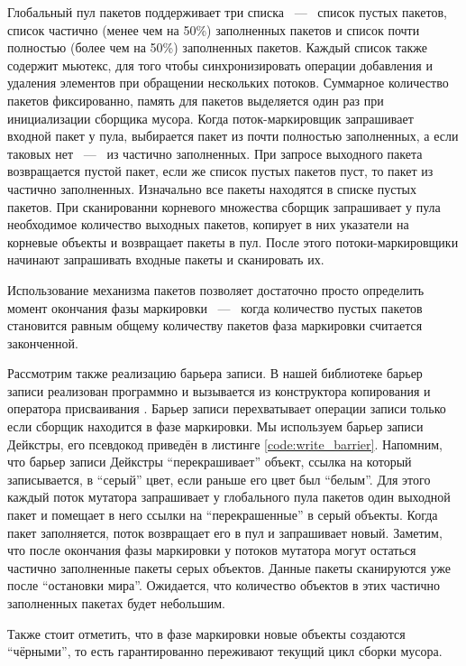 Глобальный пул пакетов поддерживает три списка ~---~ список пустых пакетов, 
список частично (менее чем на 50\%) заполненных пакетов и список почти полностью 
(более чем на 50\%) заполненных пакетов. 
Каждый список также содержит мьютекс, для того чтобы синхронизировать операции добавления 
и удаления элементов при обращении нескольких потоков. 
Суммарное количество пакетов фиксированно, память для пакетов выделяется один раз 
при инициализации сборщика мусора. 
Когда поток-маркировщик запрашивает входной пакет у пула, выбирается пакет из почти 
полностью заполненных, а если таковых нет ~---~ из частично заполненных. 
При запросе выходного пакета возвращается пустой пакет, если же список пустых пакетов пуст, 
то пакет из частично заполненных. 
Изначально все пакеты находятся в списке пустых пакетов. 
При сканированни корневого множества сборщик запрашивает у пула необходимое количество 
выходных пакетов, копирует в них указатели на корневые объекты и возвращает пакеты в пул. 
После этого потоки-маркировщики начинают запрашивать входные пакеты и сканировать их. 

Использование механизма пакетов позволяет достаточно просто определить момент окончания 
фазы маркировки ~---~ когда количество пустых пакетов становится равным общему количеству 
пакетов фаза маркировки считается законченной. 

Рассмотрим также реализацию барьера записи. 
В нашей библиотеке барьер записи реализован программно и вызывается из конструктора 
копирования и оператора присваивания . 
Барьер записи перехватывает операции записи только если сборщик находится в фазе маркировки. 
Мы используем барьер записи Дейкстры, его псевдокод приведён в листинге 
\ref{code:write_barrier}. 
Напомним, что барьер записи Дейкстры ``перекрашивает'' объект, ссылка на который записывается, 
в ``серый'' цвет, если раньше его цвет был ``белым''. 
Для этого каждый поток мутатора запрашивает у глобального пула пакетов один выходной пакет 
и помещает в него ссылки на ``перекрашенные'' в серый объекты. 
Когда пакет заполняется, поток возвращает его в пул и запрашивает новый. 
Заметим, что после окончания фазы маркировки у потоков мутатора могут остаться частично 
заполненные пакеты серых объектов. 
Данные пакеты сканируются уже после ``остановки мира''. 
Ожидается, что количество объектов в этих частично заполненных пакетах будет небольшим.

Также стоит отметить, что в фазе маркировки новые объекты создаются ``чёрными'', 
то есть гарантированно переживают текущий цикл сборки мусора.

